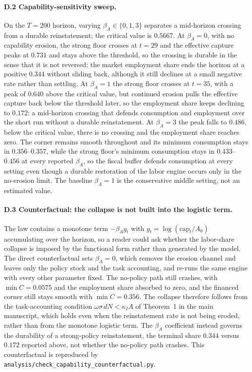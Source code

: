 \documentclass[12pt]{article}
\theoremstyle{plain}
\begin{document}
\paragraph{D.2 Capability-sensitivity sweep.}
On the $T=200$ horizon, varying $\beta_A\in\{0,1,3\}$ separates a
mid-horizon crossing from a durable reinstatement; the critical value is
$0.5667$. At $\beta_A=0$, with no capability erosion, the strong floor crosses
at $t=29$ and the effective capture peaks at $0.731$ and stays above the
threshold, so the crossing is durable in the sense that it is not reversed;
the market employment share ends the horizon at a positive $0.344$ without
sliding back, although it still declines at a small negative rate rather than
settling. At $\beta_A=1$ the strong floor crosses at $t=35$, with a peak of
$0.640$ above the critical value, but continued erosion pulls the effective
capture back below the threshold later, so the employment share keeps declining
to $0.172$: a mid-horizon crossing that defends consumption and employment
over the short run without a durable reinstatement. At $\beta_A=3$ the peak
falls to $0.486$, below the critical value, there is no crossing and the
employment share reaches zero. The corner remains smooth throughout and its
minimum consumption stays in $0.356$--$0.357$, while the strong floor's
minimum consumption stays in $0.433$--$0.456$ at every reported $\beta_A$, so
the fiscal buffer defends consumption at every setting even though a durable
restoration of the labor engine occurs only in the no-erosion limit. The
baseline $\beta_A=1$ is the conservative middle setting, not an estimated
value.

\paragraph{D.3 Counterfactual: the collapse is not built into the logistic term.}
The law contains a monotone term $-\beta_A g_t$ with $g_t=\log(\mathrm{cap}_t
/A_0)$ accumulating over the horizon, so a reader could ask whether the
labor-share collapse is imposed by the functional form rather than generated
by the model. The direct counterfactual sets $\beta_A=0$, which removes the
erosion channel and leaves only the policy stock and the task accounting, and
re-runs the same engine with every other parameter fixed. The no-policy path
still crashes, with $\min C=0.0575$ and the employment share absorbed to
zero, and the financed corner still stays smooth with $\min C=0.356$. The
collapse therefore follows from the task-accounting condition
$\omega\sigma\,dN<\kappa_I A$ of Theorem~1 in the main manuscript, which holds
even when the reinstatement rate is not being eroded, rather than from the
monotone logistic term. The $\beta_A$ coefficient instead governs the
durability of a strong-policy reinstatement, the terminal share $0.344$ versus
$0.172$ reported above, not whether the no-policy path crashes. This
counterfactual is reproduced by
\texttt{analysis/check\_capability\_counterfactual.py}.
\end{document}
